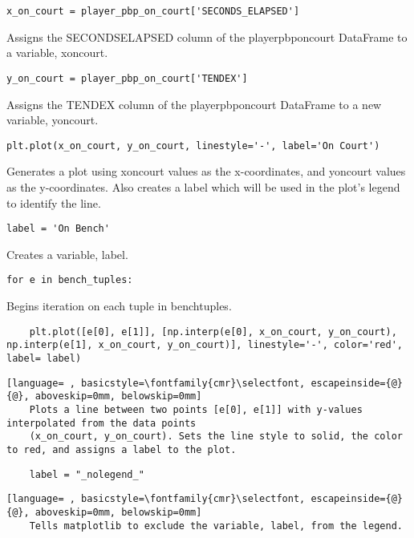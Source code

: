 \documentclass{article}
\begin{document}
\begin{lstlisting}
x_on_court = player_pbp_on_court['SECONDS_ELAPSED']
\end{lstlisting}
Assigns the SECONDS\textunderscore ELAPSED column of the player\textunderscore pbp\textunderscore on\textunderscore court DataFrame to a variable, x\textunderscore on\textunderscore court.
\begin{lstlisting}
y_on_court = player_pbp_on_court['TENDEX']
\end{lstlisting}
Assigns the TENDEX column of the player\textunderscore pbp\textunderscore on\textunderscore court DataFrame to a new variable, y\textunderscore on\textunderscore court.
\begin{lstlisting}
plt.plot(x_on_court, y_on_court, linestyle='-', label='On Court')
\end{lstlisting}
Generates a plot using x\textunderscore on\textunderscore court values as the x-coordinates, and y\textunderscore on\textunderscore court values as the y-coordinates. Also creates a label which will be used in the plot's legend to identify the line.
\begin{lstlisting}
label = 'On Bench'
\end{lstlisting}
Creates a variable, label.
\begin{lstlisting}
for e in bench_tuples:
\end{lstlisting}
Begins iteration on each tuple in bench\textunderscore tuples.
\begin{lstlisting}
    plt.plot([e[0], e[1]], [np.interp(e[0], x_on_court, y_on_court), np.interp(e[1], x_on_court, y_on_court)], linestyle='-', color='red', label= label)
\end{lstlisting}
\begin{lstlisting}[language= , basicstyle=\fontfamily{cmr}\selectfont, escapeinside={@}{@}, aboveskip=0mm, belowskip=0mm]
    Plots a line between two points [e[0], e[1]] with y-values interpolated from the data points
    (x_on_court, y_on_court). Sets the line style to solid, the color to red, and assigns a label to the plot.
\end{lstlisting}
\begin{lstlisting}
    label = "_nolegend_"
\end{lstlisting}
\begin{lstlisting}[language= , basicstyle=\fontfamily{cmr}\selectfont, escapeinside={@}{@}, aboveskip=0mm, belowskip=0mm]
    Tells matplotlib to exclude the variable, label, from the legend.
\end{lstlisting}
\end{document}
